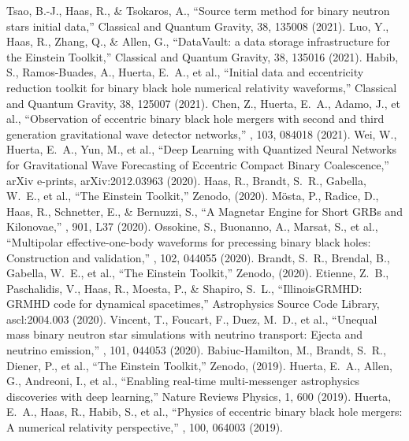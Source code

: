  Tsao, B.-J., Haas, R., \& Tsokaros, A., ``Source term method for binary neutron stars initial data,'' Classical and Quantum Gravity, 38, 135008 (2021).
 Luo, Y., Haas, R., Zhang, Q., \& Allen, G., ``DataVault: a data storage infrastructure for the Einstein Toolkit,'' Classical and Quantum Gravity, 38, 135016 (2021).
 Habib, S., Ramos-Buades, A., Huerta, E.~A., et al., ``Initial data and eccentricity reduction toolkit for binary black hole numerical relativity waveforms,'' Classical and Quantum Gravity, 38, 125007 (2021).
 Chen, Z., Huerta, E.~A., Adamo, J., et al., ``Observation of eccentric binary black hole mergers with second and third generation gravitational wave detector networks,'' \prd, 103, 084018 (2021).
 Wei, W., Huerta, E.~A., Yun, M., et al., ``Deep Learning with Quantized Neural Networks for Gravitational Wave Forecasting of Eccentric Compact Binary Coalescence,'' arXiv e-prints, arXiv:2012.03963 (2020).
 Haas, R., Brandt, S.~R., Gabella, W.~E., et al., ``The Einstein Toolkit,'' Zenodo, (2020).
 M{\"o}sta, P., Radice, D., Haas, R., Schnetter, E., \& Bernuzzi, S., ``A Magnetar Engine for Short GRBs and Kilonovae,'' \apjl, 901, L37 (2020).
 Ossokine, S., Buonanno, A., Marsat, S., et al., ``Multipolar effective-one-body waveforms for precessing binary black holes: Construction and validation,'' \prd, 102, 044055 (2020).
 Brandt, S.~R., Brendal, B., Gabella, W.~E., et al., ``The Einstein Toolkit,'' Zenodo, (2020).
 Etienne, Z.~B., Paschalidis, V., Haas, R., Moesta, P., \& Shapiro, S.~L., ``IllinoisGRMHD: GRMHD code for dynamical spacetimes,'' Astrophysics Source Code Library, ascl:2004.003 (2020).
 Vincent, T., Foucart, F., Duez, M.~D., et al., ``Unequal mass binary neutron star simulations with neutrino transport: Ejecta and neutrino emission,'' \prd, 101, 044053 (2020).
 Babiuc-Hamilton, M., Brandt, S.~R., Diener, P., et al., ``The Einstein Toolkit,'' Zenodo, (2019).
 Huerta, E.~A., Allen, G., Andreoni, I., et al., ``Enabling real-time multi-messenger astrophysics discoveries with deep learning,'' Nature Reviews Physics, 1, 600 (2019).
 Huerta, E.~A., Haas, R., Habib, S., et al., ``Physics of eccentric binary black hole mergers: A numerical relativity perspective,'' \prd, 100, 064003 (2019).
